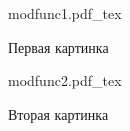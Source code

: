 \documentclass[12pt,a4paper]{article}
\newcommand{\incfig}[1]{%
    \def\svgwidth{\columnwidth}
    {#1.pdf_tex}
}
\begin{document}
\begin{figure}[ht]
    \centering
    \incfig{modfunc1}
    \caption{Первая картинка}
    \label{fig:modfunc1}
\end{figure}

\begin{figure}[ht]
    \centering
    \incfig{modfunc2}
    \caption{Вторая картинка}
    \label{fig:modfunc2}
\end{figure}
\end{document}
